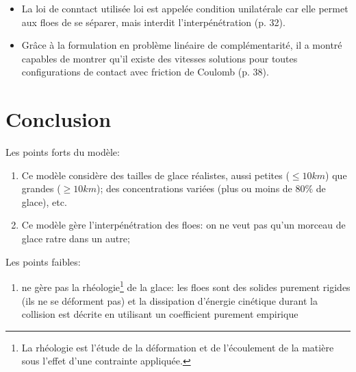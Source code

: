 \documentclass[
  french,
	11pt, %
]{fphw}
\begin{document}
\begin{itemize}
  \item La loi de conntact utilisée loi est appelée condition unilatérale car elle permet aux floes de se séparer, mais interdit l’interpénétration (p. 32).
  \item Grâce à la formulation en problème linéaire de complémentarité, il a montré capables de montrer qu’il existe des vitesses solutions pour toutes configurations de contact avec friction de Coulomb (p. 38). 
\end{itemize}


\section*{Conclusion}

Les points forts du modèle:
\begin{enumerate}
  \item Ce modèle considère des tailles de glace réalistes, aussi petites ($\leq 10 km$) que grandes ($\geq 10 km$); des concentrations variées (plus ou moins de $80 \%$ de glace), etc.
  \item Ce modèle gère l'interpénétration des floes: on ne veut pas qu'un morceau de glace ratre dans un autre;
\end{enumerate}


Les points faibles:
\begin{enumerate}
  \item ne gère pas la rhéologie\footnote{La rhéologie est l'étude de la déformation et de l'écoulement de la matière sous l'effet d'une contrainte appliquée.} de la glace: les floes sont des solides purement rigides (ils ne se déforment pas) et la dissipation d’énergie cinétique durant la collision est décrite en utilisant un coefficient purement empirique
\end{enumerate}






\end{document}
